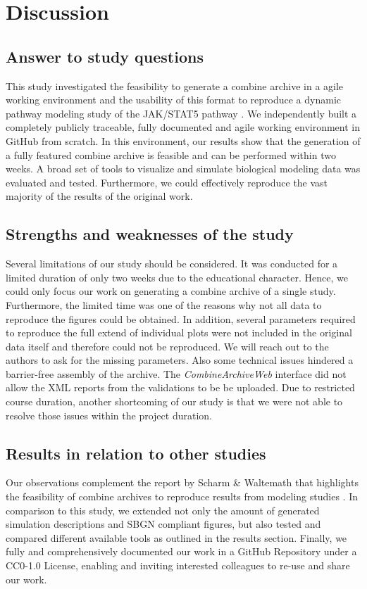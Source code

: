 \section*{Discussion}

\subsection*{Answer to study questions}
This study investigated the feasibility to generate a \ac{combine} archive in a agile working environment and the usability of this format to reproduce a dynamic pathway modeling study of the JAK/STAT5 pathway \cite{bachmannmodel}. We independently built a completely publicly traceable, fully documented and agile working environment in GitHub from scratch. In this environment, our results show that the generation of a fully featured \ac{combine} archive is feasible and can be performed within two weeks. A broad set of tools to visualize and simulate biological modeling data was evaluated and tested. Furthermore, we could effectively reproduce the vast majority of the results of the original work. 

\subsection*{Strengths and weaknesses of the study}
Several limitations of our study should be considered. It was conducted for a limited duration of only two weeks due to the educational character. Hence, we could only focus our work on generating a \ac{combine} archive of a single study. Furthermore, the limited time was one of the reasons why not all data to reproduce the figures could be obtained. In addition, several parameters required to reproduce the full extend of individual plots were not included in the original data itself and therefore could not be reproduced. We will reach out to the authors to ask for the missing parameters.
Also some technical issues hindered a barrier-free assembly of the archive. The \textit{CombineArchiveWeb} interface did not allow the XML reports from the validations to be be uploaded. Due to restricted course duration, another shortcoming of our study is that we were not able to resolve those issues within the project duration.

\subsection*{Results in relation to other studies}
Our observations complement the report by Scharm \& Waltemath \cite{combine} that highlights the feasibility of \ac{combine} archives to reproduce results from modeling studies \cite{calzone2007dynamical}. In comparison to this study, we extended not only the amount of generated simulation descriptions and SBGN compliant figures, but also tested and compared different available tools as outlined in the results section. Finally, we fully and comprehensively documented our work in a GitHub Repository under a CC0-1.0 License, enabling and inviting interested colleagues to re-use and share our work.

